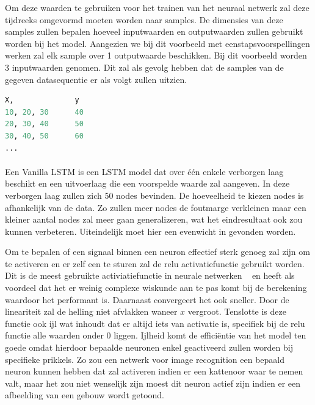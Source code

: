 Om deze waarden te gebruiken voor het trainen van het neuraal netwerk zal deze tijdreeks omgevormd moeten worden naar samples. De dimensies van deze samples zullen bepalen hoeveel inputwaarden en outputwaarden zullen gebruikt worden bij het model. Aangezien we bij dit voorbeeld met eenstapsvoorspellingen werken zal elk sample over 1 outputwaarde beschikken. Bij dit voorbeeld worden 3 inputwaarden genomen. Dit zal als gevolg hebben dat de samples van de gegeven datasequentie er als volgt zullen uitzien.

\begin{lstlisting}[language=Python]
X,		        y
10, 20, 30		40
20, 30, 40		50
30, 40, 50		60
...
\end{lstlisting}

\paragraph{}

Een Vanilla LSTM is een LSTM model dat over \'{e}\'{e}n enkele verborgen laag beschikt en een uitvoerlaag die een voorspelde waarde zal aangeven. In deze verborgen laag zullen zich 50 nodes bevinden. De hoeveelheid te kiezen nodes is afhankelijk van de data. Zo zullen meer nodes de foutmarge verkleinen maar een kleiner aantal nodes zal meer gaan generalizeren, wat het eindresultaat ook zou kunnen verbeteren. Uiteindelijk moet hier een evenwicht in gevonden worden.

Om te bepalen of een signaal binnen een neuron effectief sterk genoeg zal zijn om te activeren en er zelf een te sturen zal de relu activatiefunctie gebruikt worden. Dit is de meest gebruikte activiatiefunctie in neurale netwerken ~\autocite{Liu2017} en heeft als voordeel dat het er weinig complexe wiskunde aan te pas komt bij de berekening waardoor het performant is. Daarnaast convergeert het ook sneller. Door de lineariteit zal de helling niet afvlakken waneer $x$ vergroot. Tenslotte is deze functie ook ijl wat inhoudt dat er altijd iets van activatie is, specifiek bij de relu functie alle waarden onder 0 liggen. Ijlheid komt de effici\"{e}ntie van het model ten goede omdat hierdoor bepaalde neuronen enkel geactiveerd zullen worden bij specifieke prikkels. Zo zou een netwerk voor image recognition een bepaald neuron kunnen hebben dat zal activeren indien er een kattenoor waar te nemen valt, maar het zou niet wenselijk zijn moest dit neuron actief zijn indien er een afbeelding van een gebouw wordt getoond.   


